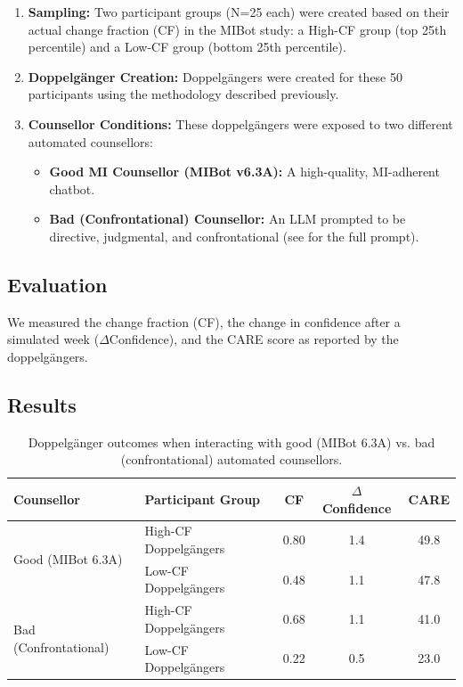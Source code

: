 \begin{enumerate}
	\item \textbf{Sampling:} Two participant groups (N=25 each) were created based on their actual change fraction (CF) in the MIBot study: a High-CF group (top 25th percentile) and a Low-CF group (bottom 25th percentile).

	\item \textbf{Doppelgänger Creation:} Doppelgängers were created for these 50 participants using the methodology described previously.

	\item \textbf{Counsellor Conditions:} These doppelgängers were exposed to two different automated counsellors:
	      \begin{itemize}
		      \item \textbf{Good MI Counsellor (MIBot v6.3A):} A high-quality, MI-adherent chatbot.

		      \item \textbf{Bad (Confrontational) Counsellor:} An LLM prompted to be directive, judgmental, and confrontational (see  for the full prompt).
	      \end{itemize}
\end{enumerate}

\subsection{Evaluation}
We measured the change fraction (CF), the change in confidence after a simulated week ($\Delta$Confidence), and the CARE score as reported by the doppelgängers.

\subsection{Results}

\begin{table}[ht!]
	\centering
	\begin{tabular}{@{}llccc@{}}
		\toprule
		\textbf{Counsellor}                    & \textbf{Participant Group} & \textbf{CF} & \textbf{$\Delta$Confidence} & \textbf{CARE} \\ \midrule
		\multirow{2}{*}{Good (MIBot 6.3A)}     & High-CF Doppelgängers      & 0.80        & 1.4                         & 49.8          \\
		                                       & Low-CF Doppelgängers       & 0.48        & 1.1                         & 47.8          \\ \midrule
		\multirow{2}{*}{Bad (Confrontational)} & High-CF Doppelgängers      & 0.68        & 1.1                         & 41.0          \\
		                                       & Low-CF Doppelgängers       & 0.22        & 0.5                         & 23.0          \\ \bottomrule
	\end{tabular}
	\caption[Effect of counselling quality on doppelgängers' motivational language]{Doppelgänger outcomes when interacting with good (MIBot 6.3A) vs. bad (confrontational) automated counsellors.}
	\label{tab:good-vs-bad-counselling}
\end{table}

